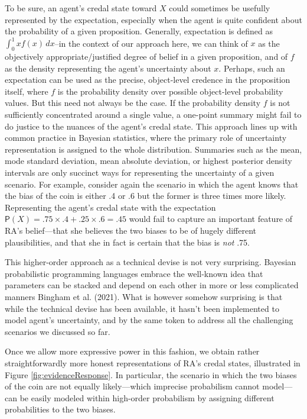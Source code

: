 \documentclass[
  10pt,
  dvipsnames,enabledeprecatedfontcommands]{scrartcl}
\begin{document}
To be sure, an agent's credal state toward \(X\) could sometimes be
usefully represented by the expectation, especially when the agent is
quite confident about the probability of a given proposition. Generally,
expectation is defined as \(\int_{0}^{1} x f(x) \, dx\)--in the context
of our approach here, we can think of \(x\) as the objectively
appropriate/justified degree of belief in a given proposition, and of
\(f\) as the density representing the agent's uncertainty about \(x\).
Perhaps, such an expectation can be used as the precise, object-level
credence in the proposition itself, where \(f\) is the probability
density over possible object-level probability values. But this need not
always be the case. If the probability density \(f\) is not sufficiently
concentrated around a single value, a one-point summary might fail to do
justice to the nuances of the agent's credal state. This approach lines
up with common practice in Bayesian statistics, where the primary role
of uncertainty representation is assigned to the whole distribution.
Summaries such as the mean, mode standard deviation, mean absolute
deviation, or highest posterior density intervals are only succinct ways
for representing the uncertainty of a given scenario. For example,
consider again the scenario in which the agent knows that the bias of
the coin is either .4 or .6 but the former is three times more likely.
Representing the agent's credal state with the expectation
\(\mathsf{P}(X) = .75 \times .4 + .25 \times .6 = .45\) would fail to
capture an important feature of RA's belief---that she believes the two
biases to be of hugely different plausibilities, and that she in fact is
certain that the bias is \emph{not} .75.

This higher-order approach as a technical devise is not very surprising.
Bayesian probabilistic programming languages embrace the well-known idea
that parameters can be stacked and depend on each other in more or less
complicated manners Bingham et al. (2021). What is however somehow
surprising is that while the technical devise has been available, it
hasn't been implemented to model agent's uncertainty, and by the same
token to address all the challenging scenarios we discussed so far.

Once we allow more expressive power in this fashion, we obtain rather
straightforwardly more honest representations of RA's credal states,
illustrated in Figure \ref{fig:evidenceResponse}. In particular, the
scenario in which the two biases of the coin are not equally
likely---which imprecise probabilism cannot model---can be easily
modeled within high-order probabilism by assigning different
probabilities to the two biases.
\end{document}

